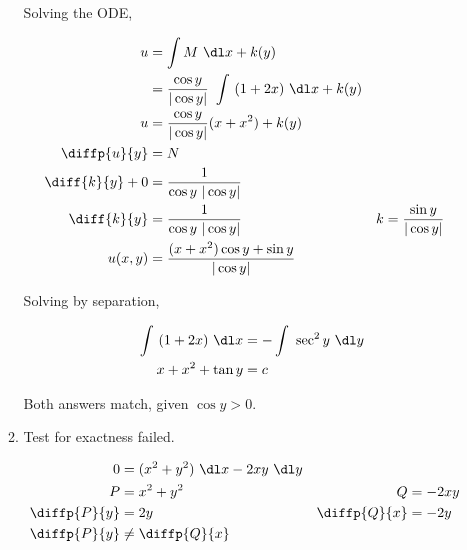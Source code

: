 \begin{enumerate}
\begin{enumerate}
                    Solving the ODE,

                    \begin{align}
                        u               & = \int M\ \dl x + k(y)                    \\
                                        & = \frac{\cos y}{|\cos y|}\ \int\ (1+2x)
                        \ \dl x + k(y)                                              \\
                        u               & = \frac{\cos y}{|\cos y|} (x + x^{2})
                        + k(y)                                                      \\
                        \diffp{u}{y}    & = N                                       \\
                        \diff{k}{y} + 0 & = \frac{1}{\cos y\ |\cos y|}              \\
                        \diff{k}{y}     & = \frac{1}{\cos y\ |\cos y|}            &
                        k               & = \frac{\sin y}{|\cos y|}                 \\
                        u(x, y)         & = \frac{(x+x^{2})\cos y + \sin y}
                        {|\cos y|}
                    \end{align}

                    Solving by separation,

                    \begin{align}
                        \int\ (1+2x)\ \dl x & = -\int\ \sec^{2}y\ \dl y \\
                        x + x^{2} + \tan y  & =  c
                    \end{align}

                    Both answers match, given $ \cos y > 0 $.

              \item Test for exactness failed.

                    \begin{align}
                        0            & = (x^{2} + y^{2})\ \dl x - 2xy\ \dl y   \\
                        P            & = x^{2} + y^{2}                       &
                        Q            & = -2xy                                  \\
                        \diffp{P}{y} & = 2y                                  &
                        \diffp{Q}{x} & = -2y                                   \\
                        \diffp{P}{y} & \neq \diffp{Q}{x}
                    \end{align}


\end{enumerate}
\end{enumerate}
